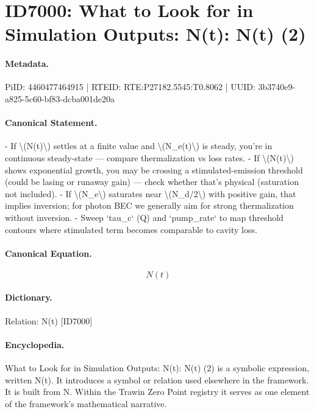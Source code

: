\section*{ID7000: What to Look for in Simulation Outputs: N(t): N(t) (2)}
\paragraph{Metadata.}
PiID: 4460477464915 | RTEID: RTE:P27182.5545:T0.8062 | UUID: 3b3740e9-a825-5c60-bf83-dcba001de20a

\paragraph{Canonical Statement.}
- If \textbackslash{}(N(t)\textbackslash{}) settles at a finite value and \textbackslash{}(N\_e(t)\textbackslash{}) is steady, you’re in continuous steady-state — compare thermalization vs loss rates. - If \textbackslash{}(N(t)\textbackslash{}) shows exponential growth, you may be crossing a stimulated-emission threshold (could be lasing or runaway gain) — check whether that’s physical (saturation not included). - If \textbackslash{}(N\_e\textbackslash{}) saturates near \textbackslash{}(N\_d/2\textbackslash{}) with positive gain, that implies inversion; for photon BEC we generally aim for strong thermalization without inversion. - Sweep `tau\_c` (Q) and `pump\_rate` to map threshold contours where stimulated term becomes comparable to cavity loss.

\paragraph{Canonical Equation.}
\[
N(t)
\]

\paragraph{Dictionary.}
Relation: N(t) [ID7000]

\paragraph{Encyclopedia.}
What to Look for in Simulation Outputs: N(t): N(t) (2) is a symbolic expression, written N(t). It introduces a symbol or relation used elsewhere in the framework. It is built from N. Within the Trawin Zero Point registry it serves as one element of the framework's mathematical narrative.
